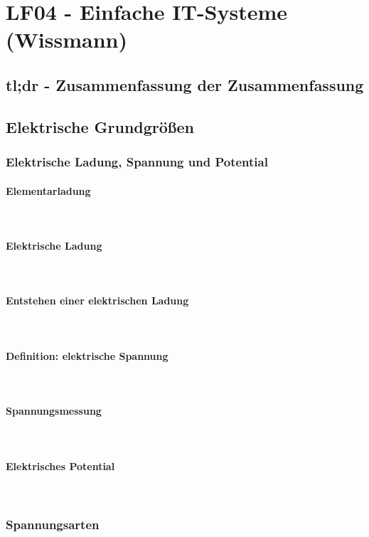 \section{LF04 - Einfache IT-Systeme (Wissmann)}


\subsection{tl;dr - Zusammenfassung der Zusammenfassung}

\subsection{Elektrische Grundgrößen}
	\subsubsection{Elektrische Ladung, Spannung und Potential}
		\paragraph{Elementarladung}~\\
		\paragraph{Elektrische Ladung}~\\
		\paragraph{Entstehen einer elektrischen Ladung}~\\
		\paragraph{Definition: elektrische Spannung}~\\
		\paragraph{Spannungsmessung}~\\
		\paragraph{Elektrisches Potential}~\\
	\subsubsection{Spannungsarten}
